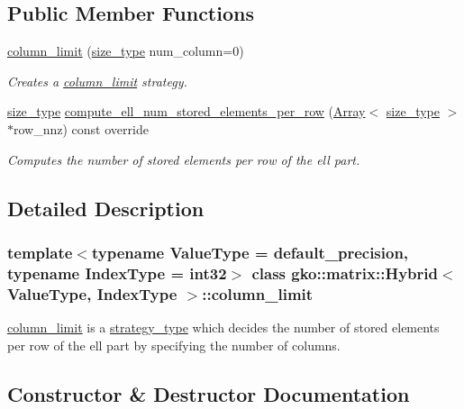 \subsection*{Public Member Functions}
\begin{DoxyCompactItemize}
\item 
\hyperlink{classgko_1_1matrix_1_1Hybrid_1_1column__limit_ac686f3f99034bffd091bd934bd1cf9f9}{column\+\_\+limit} (\hyperlink{namespacegko_a6e5c95df0ae4e47aab2f604a22d98ee7}{size\+\_\+type} num\+\_\+column=0)
\begin{DoxyCompactList}\small\item\em Creates a \hyperlink{classgko_1_1matrix_1_1Hybrid_1_1column__limit}{column\+\_\+limit} strategy. \end{DoxyCompactList}\item 
\hyperlink{namespacegko_a6e5c95df0ae4e47aab2f604a22d98ee7}{size\+\_\+type} \hyperlink{classgko_1_1matrix_1_1Hybrid_1_1column__limit_afb410def66106b711ac094fd31d48aba}{compute\+\_\+ell\+\_\+num\+\_\+stored\+\_\+elements\+\_\+per\+\_\+row} (\hyperlink{classgko_1_1Array}{Array}$<$ \hyperlink{namespacegko_a6e5c95df0ae4e47aab2f604a22d98ee7}{size\+\_\+type} $>$ $\ast$row\+\_\+nnz) const override
\begin{DoxyCompactList}\small\item\em Computes the number of stored elements per row of the ell part. \end{DoxyCompactList}\end{DoxyCompactItemize}


\subsection{Detailed Description}
\subsubsection*{template$<$typename Value\+Type = default\+\_\+precision, typename Index\+Type = int32$>$\newline
class gko\+::matrix\+::\+Hybrid$<$ Value\+Type, Index\+Type $>$\+::column\+\_\+limit}

\hyperlink{classgko_1_1matrix_1_1Hybrid_1_1column__limit}{column\+\_\+limit} is a \hyperlink{classgko_1_1matrix_1_1Hybrid_1_1strategy__type}{strategy\+\_\+type} which decides the number of stored elements per row of the ell part by specifying the number of columns. 

\subsection{Constructor \& Destructor Documentation}
\mbox{\label{classgko_1_1matrix_1_1Hybrid_1_1column__limit_ac686f3f99034bffd091bd934bd1cf9f9}} 
